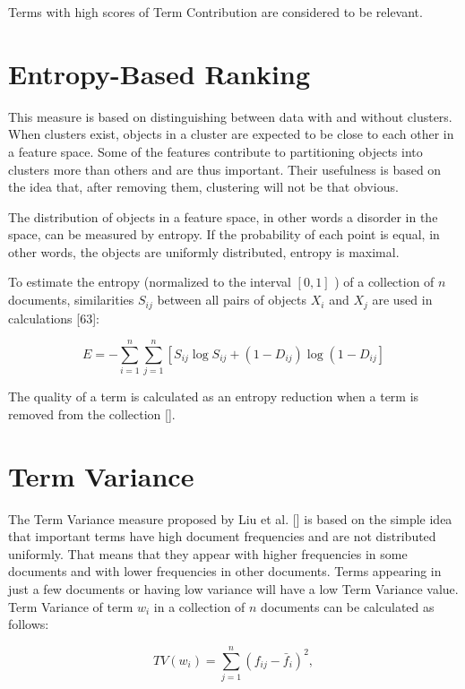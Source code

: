 Terms with high scores of Term Contribution are considered to be relevant.

\section{Entropy-Based Ranking}
This measure is based on distinguishing between data with and without clusters. When clusters exist, objects in a cluster are expected to be close to each other in a feature space. Some of the features contribute to partitioning objects into clusters more than others and are thus important. Their usefulness is based on the idea that, after removing them, clustering will not be that obvious.

The distribution of objects in a feature space, in other words a disorder in the space, can be measured by entropy. If the probability of each point is equal, in other words, the objects are uniformly distributed, entropy is maximal.

To estimate the entropy (normalized to the interval $[0,1]$ ) of a collection of $n$ documents, similarities $S_{i j}$ between all pairs of objects $X_{i}$ and $X_{j}$ are used in calculations [63]:


\begin{equation*}
E=-\sum_{i=1}^{n} \sum_{j=1}^{n}\left[S_{i j} \log S_{i j}+\left(1-D_{i j}\right) \log \left(1-D_{i j}\right]\right. \tag{14.25}
\end{equation*}


The quality of a term is calculated as an entropy reduction when a term is removed from the collection [\cite{ref7}].

\section{Term Variance}
The Term Variance measure proposed by Liu et al. [\cite{ref178}] is based on the simple idea that important terms have high document frequencies and are not distributed uniformly. That means that they appear with higher frequencies in some documents and with lower frequencies in other documents. Terms appearing in just a few documents or having low variance will have a low Term Variance value. Term Variance of term $w_{i}$ in a collection of $n$ documents can be calculated as follows:


\begin{equation*}
T V\left(w_{i}\right)=\sum_{j=1}^{n}\left(f_{i j}-\bar{f}_{i}\right)^{2}, \tag{14.26}
\end{equation*}



